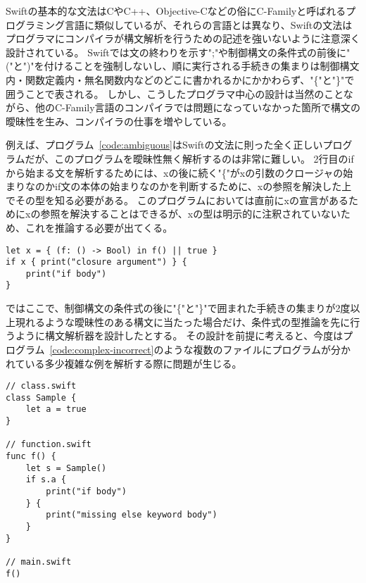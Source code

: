 Swiftの基本的な文法はCやC++、Objective-Cなどの俗にC-Familyと呼ばれるプログラミング言語に類似しているが、それらの言語とは異なり、Swiftの文法はプログラマにコンパイラが構文解析を行うための記述を強いないように注意深く設計されている。
Swiftでは文の終わりを示す";"や制御構文の条件式の前後に"("と")"を付けることを強制しないし、順に実行される手続きの集まりは制御構文内・関数定義内・無名関数内などのどこに書かれるかにかかわらず、"\{"と"\}"で囲うことで表される。
しかし、こうしたプログラマ中心の設計は当然のことながら、他のC-Family言語のコンパイラでは問題になっていなかった箇所で構文の曖昧性を生み、コンパイラの仕事を増やしている。

例えば、プログラム~\ref{code:ambiguous}はSwiftの文法に則った全く正しいプログラムだが、このプログラムを曖昧性無く解析するのは非常に難しい。
2行目のifから始まる文を解析するためには、xの後に続く"\{"がxの引数のクロージャの始まりなのかif文の本体の始まりなのかを判断するために、xの参照を解決した上でその型を知る必要がある。
このプログラムにおいては直前にxの宣言があるためにxの参照を解決することはできるが、xの型は明示的に注釈されていないため、これを推論する必要が出てくる。

\begin{lstlisting}[caption=曖昧な構文を持った正しいSwiftプログラム, label=code:ambiguous]
let x = { (f: () -> Bool) in f() || true }
if x { print("closure argument") } {
    print("if body")
}
\end{lstlisting}

ではここで、制御構文の条件式の後に"\{"と"\}"で囲まれた手続きの集まりが2度以上現れるような曖昧性のある構文に当たった場合だけ、条件式の型推論を先に行うように構文解析器を設計したとする。
その設計を前提に考えると、今度はプログラム~\ref{code:complex-incorrect}のような複数のファイルにプログラムが分かれている多少複雑な例を解析する際に問題が生じる。
\begin{lstlisting}[caption=特定のアプローチではエラーの検出に多大な計算量を要する誤ったSwiftプログラム, label=code:complex-incorrect]
// class.swift
class Sample {
    let a = true
}

// function.swift
func f() {
    let s = Sample()
    if s.a {
        print("if body")
    } {
        print("missing else keyword body")
    }
}

// main.swift
f()
\end{lstlisting}

